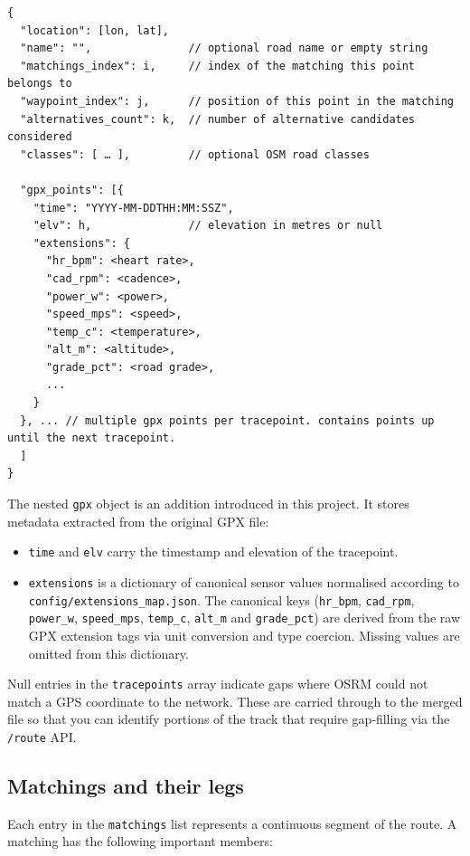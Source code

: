\documentclass[11pt,a4paper]{article}
\begin{document}
\begin{verbatim}
{
  "location": [lon, lat],
  "name": "",               // optional road name or empty string
  "matchings_index": i,     // index of the matching this point belongs to
  "waypoint_index": j,      // position of this point in the matching
  "alternatives_count": k,  // number of alternative candidates considered
  "classes": [ … ],         // optional OSM road classes

  "gpx_points": [{
    "time": "YYYY‑MM‑DDTHH:MM:SSZ",
    "elv": h,               // elevation in metres or null
    "extensions": {
      "hr_bpm": <heart rate>,
      "cad_rpm": <cadence>,
      "power_w": <power>,
      "speed_mps": <speed>,
      "temp_c": <temperature>,
      "alt_m": <altitude>,
      "grade_pct": <road grade>,
      ...
    }
  }, ... // multiple gpx points per tracepoint. contains points up until the next tracepoint.
  ]
}
\end{verbatim}

The nested \verb|gpx| object is an addition introduced in this project.  It stores metadata extracted from the original GPX file:
\begin{itemize}
	\item \texttt{time} and \texttt{elv} carry the timestamp and elevation of the tracepoint.
	\item \texttt{extensions} is a dictionary of canonical sensor values normalised according to \texttt{config/extensions\_map.json}.  The canonical keys (\texttt{hr\_bpm}, \texttt{cad\_rpm}, \texttt{power\_w}, \texttt{speed\_mps}, \texttt{temp\_c}, \texttt{alt\_m} and \texttt{grade\_pct}) are derived from the raw GPX extension tags via unit conversion and type coercion.  Missing values are omitted from this dictionary.
\end{itemize}

Null entries in the \texttt{tracepoints} array indicate gaps where OSRM could not match a GPS coordinate to the network.  These are carried through to the merged file so that you can identify portions of the track that require gap‑filling via the \texttt{/route} API.

\subsection{Matchings and their legs}
Each entry in the \texttt{matchings} list represents a continuous segment of the route.  A matching has the following important members:
\end{document}
